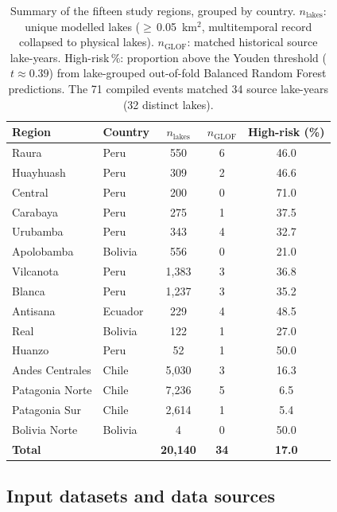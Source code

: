 \documentclass[pdflatex,sn-basic]{sn-jnl}%
\begin{document}
\begin{table}[!t]
\caption{Summary of the fifteen study regions, grouped by country.
  $n_\text{lakes}$: unique modelled lakes ($\geq$\,0.05~km$^2$,
  multitemporal record collapsed to physical lakes).
  $n_\text{GLOF}$: matched historical source lake-years. High-risk\,\%:
  proportion above the Youden threshold ($t\!\approx\!0.39$) from lake-grouped
  out-of-fold Balanced Random Forest predictions. The 71 compiled events
  matched 34 source lake-years (32 distinct lakes).}
\label{tab:study_areas}
\centering
\begin{tabular*}{\textwidth}{@{\extracolsep{\fill}}llccc}
\toprule
\textbf{Region} & \textbf{Country} & \textbf{$n_\text{lakes}$}
  & \textbf{$n_\text{GLOF}$} & \textbf{High-risk (\%)} \\
\midrule
Raura            & Peru    &   550 & 6 & 46.0 \\
Huayhuash        & Peru    &   309 & 2 & 46.6 \\
Central          & Peru    &   200 & 0 & 71.0 \\
Carabaya         & Peru    &   275 & 1 & 37.5 \\
Urubamba         & Peru    &   343 & 4 & 32.7 \\
Apolobamba       & Bolivia &   556 & 0 & 21.0 \\
Vilcanota        & Peru    & 1{,}383 & 3 & 36.8 \\
Blanca           & Peru    & 1{,}237 & 3 & 35.2 \\
Antisana         & Ecuador &   229 & 4 & 48.5 \\
Real             & Bolivia &   122 & 1 & 27.0 \\
Huanzo           & Peru    &    52 & 1 & 50.0 \\
Andes Centrales  & Chile   & 5{,}030 & 3 & 16.3 \\
Patagonia Norte  & Chile   & 7{,}236 & 5 &  6.5 \\
Patagonia Sur    & Chile   & 2{,}614 & 1 &  5.4 \\
Bolivia Norte    & Bolivia &     4 & 0 & 50.0 \\
\midrule
\textbf{Total} &  & \textbf{20{,}140} & \textbf{34} & \textbf{17.0} \\
\bottomrule
\end{tabular*}
\end{table}

\subsection{Input datasets and data sources}
\end{document}

